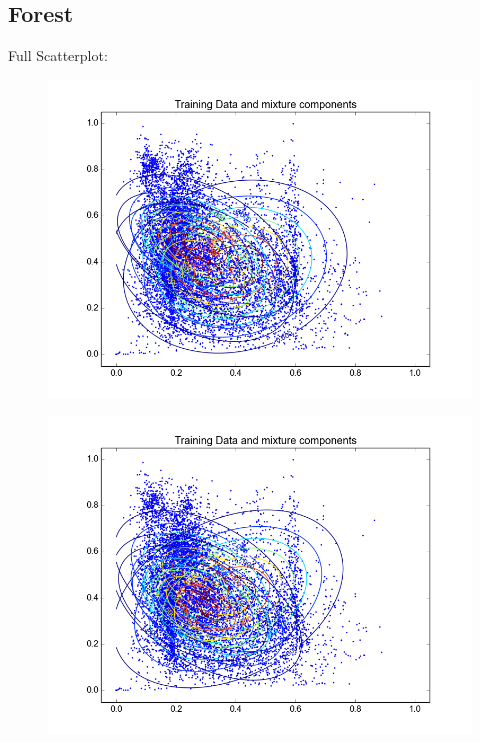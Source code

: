 \documentclass[11pt,a4paper]{article}
\begin{document}
\subsection{Forest}
Full Scatterplot: \\
\begin{minipage}[b]{0.25\textwidth}
\begin{figure}[H]
  \centering
  \includegraphics[width=.8\linewidth]{Figures/contoursforest0.png}
  \label{fig:sfig1}
\end{figure}%
\end{minipage}
\begin{minipage}[b]{0.25\textwidth}
\begin{figure}[H]
  \centering
  \includegraphics[width=.8\linewidth]{Figures/contoursforest5.png}

  \label{fig:sfig1}
\end{figure}%
\end{minipage}
\end{document}
